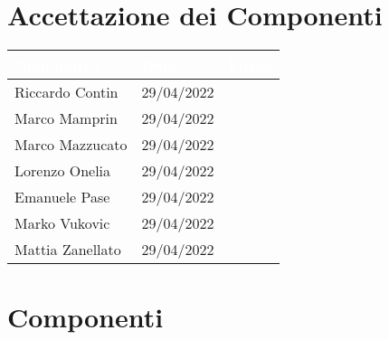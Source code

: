 \section{Accettazione dei Componenti}

\begin{center}
  \centering
  \begin{longtable}{|C{3,5cm}|C{2.2cm}|C{6,5cm}|}
    \hline
    \textcolor[HTML]{FFFFFF}{\textbf{Nominativo}} & \textcolor[HTML]{FFFFFF}{\textbf{Data}} & \textcolor[HTML]{FFFFFF}{\textbf{Firma}} \\ \hline
    Riccardo Contin & 29/04/2022 &  \\ \hline
    Marco Mamprin & 29/04/2022 &  \\ \hline
    Marco Mazzucato & 29/04/2022 &  \\ \hline
    Lorenzo Onelia & 29/04/2022 &  \\ \hline
    Emanuele Pase & 29/04/2022 &  \\ \hline
    Marko Vukovic & 29/04/2022 &  \\ \hline
    Mattia Zanellato & 29/04/2022 &  \\ \hline
  \end{longtable}
\end{center}

\section{Componenti}
\renewcommand\arraystretch{1,5}


